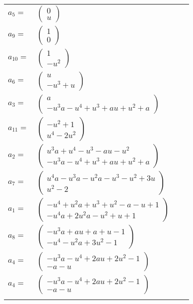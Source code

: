 \documentclass[1p]{elsarticle_modified}
\theoremstyle{definition}
\begin{document}
\begin{tabular}{m{7pt} m{180pt} m{7pt} m{180pt} }
\flushright $a_{5}=$&$\begin{pmatrix}0\\u\end{pmatrix}$ \\
\flushright $a_{9}=$&$\begin{pmatrix}1\\0\end{pmatrix}$ \\
\flushright $a_{10}=$&$\begin{pmatrix}1\\- u^2\end{pmatrix}$ \\
\flushright $a_{6}=$&$\begin{pmatrix}u\\- u^3+u\end{pmatrix}$ \\
\flushright $a_{3}=$&$\begin{pmatrix}a\\- u^3 a- u^4+u^3+a u+u^2+a\end{pmatrix}$ \\
\flushright $a_{11}=$&$\begin{pmatrix}- u^2+1\\u^4-2 u^2\end{pmatrix}$ \\
\flushright $a_{2}=$&$\begin{pmatrix}u^3 a+u^4- u^3- a u- u^2\\- u^3 a- u^4+u^3+a u+u^2+a\end{pmatrix}$ \\
\flushright $a_{7}=$&$\begin{pmatrix}u^4 a- u^3 a- u^2 a- u^3- u^2+3 u\\u^2-2\end{pmatrix}$ \\
\flushright $a_{1}=$&$\begin{pmatrix}- u^4+u^2 a+u^3+u^2- a- u+1\\- u^4 a+2 u^2 a- u^2+u+1\end{pmatrix}$ \\
\flushright $a_{8}=$&$\begin{pmatrix}- u^3 a+a u+a+u-1\\- u^4- u^2 a+3 u^2-1\end{pmatrix}$ \\
\flushright $a_{4}=$&$\begin{pmatrix}- u^3 a- u^4+2 a u+2 u^2-1\\- a- u\end{pmatrix}$\\ \flushright $a_{4}=$&$\begin{pmatrix}- u^3 a- u^4+2 a u+2 u^2-1\\- a- u\end{pmatrix}$\\&\end{tabular}
\end{document}
